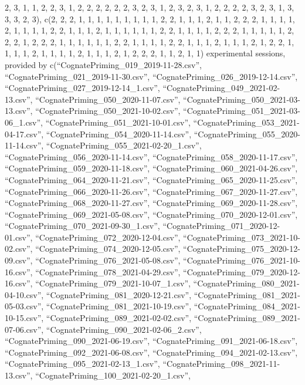 \documentclass[
  letterpaper,
  DIV=11,
  numbers=noendperiod]{scrartcl}
\begin{document}
2, 3, 1, 1, 2, 2, 3, 1, 2, 2, 2, 2, 2, 2, 3, 2, 3, 1, 2, 3, 2, 3, 1, 2,
2, 2, 2, 3, 2, 3, 1, 3, 3, 3, 2, 3), c(2, 2, 2, 1, 1, 1, 1, 1, 1, 1, 1,
1, 2, 2, 1, 1, 1, 2, 1, 1, 2, 2, 2, 1, 1, 1, 1, 2, 1, 1, 1, 1, 2, 2, 1,
1, 1, 2, 1, 1, 1, 1, 1, 1, 2, 2, 1, 1, 1, 1, 2, 2, 2, 1, 1, 1, 1, 1, 2,
2, 2, 1, 2, 2, 2, 1, 1, 1, 1, 1, 1, 2, 2, 1, 1, 1, 1, 2, 2, 1, 1, 1, 2,
1, 1, 1, 2, 1, 2, 2, 1, 1, 1, 1, 2, 1, 1, 1, 1, 2, 1, 1, 1, 2, 1, 2, 2,
2, 1, 1, 2, 1, 1) experimental sessions, provided by
c(``CognatePriming\_019\_2019-11-28.csv'',
``CognatePriming\_021\_2019-11-30.csv'',
``CognatePriming\_026\_2019-12-14.csv'',
``CognatePriming\_027\_2019-12-14\_1.csv'',
``CognatePriming\_049\_2021-02-13.csv'',
``CognatePriming\_050\_2020-11-07.csv'',
``CognatePriming\_050\_2021-03-13.csv'',
``CognatePriming\_050\_2021-10-02.csv'',
``CognatePriming\_051\_2021-03-06\_1.csv'',
``CognatePriming\_051\_2021-10-01.csv'',
``CognatePriming\_053\_2021-04-17.csv'',
``CognatePriming\_054\_2020-11-14.csv'',
``CognatePriming\_055\_2020-11-14.csv'',
``CognatePriming\_055\_2021-02-20\_1.csv'',
``CognatePriming\_056\_2020-11-14.csv'',
``CognatePriming\_058\_2020-11-17.csv'',
``CognatePriming\_059\_2020-11-18.csv'',
``CognatePriming\_060\_2021-04-26.csv'',
``CognatePriming\_064\_2020-11-21.csv'',
``CognatePriming\_065\_2020-11-25.csv'',
``CognatePriming\_066\_2020-11-26.csv'',
``CognatePriming\_067\_2020-11-27.csv'',
``CognatePriming\_068\_2020-11-27.csv'',
``CognatePriming\_069\_2020-11-28.csv'',
``CognatePriming\_069\_2021-05-08.csv'',
``CognatePriming\_070\_2020-12-01.csv'',
``CognatePriming\_070\_2021-09-30\_1.csv'',
``CognatePriming\_071\_2020-12-01.csv'',
``CognatePriming\_072\_2020-12-04.csv'',
``CognatePriming\_073\_2021-10-02.csv'',
``CognatePriming\_074\_2020-12-05.csv'',
``CognatePriming\_075\_2020-12-09.csv'',
``CognatePriming\_076\_2021-05-08.csv'',
``CognatePriming\_076\_2021-10-16.csv'',
``CognatePriming\_078\_2021-04-29.csv'',
``CognatePriming\_079\_2020-12-16.csv'',
``CognatePriming\_079\_2021-10-07\_1.csv'',
``CognatePriming\_080\_2021-04-10.csv'',
``CognatePriming\_081\_2020-12-21.csv'',
``CognatePriming\_081\_2021-05-03.csv'',
``CognatePriming\_081\_2021-10-19.csv'',
``CognatePriming\_084\_2021-10-15.csv'',
``CognatePriming\_089\_2021-02-02.csv'',
``CognatePriming\_089\_2021-07-06.csv'',
``CognatePriming\_090\_2021-02-06\_2.csv'',
``CognatePriming\_090\_2021-06-19.csv'',
``CognatePriming\_091\_2021-06-18.csv'',
``CognatePriming\_092\_2021-06-08.csv'',
``CognatePriming\_094\_2021-02-13.csv'',
``CognatePriming\_095\_2021-02-13\_1.csv'',
``CognatePriming\_098\_2021-11-13.csv'',
``CognatePriming\_100\_2021-02-20\_1.csv'',
\end{document}

